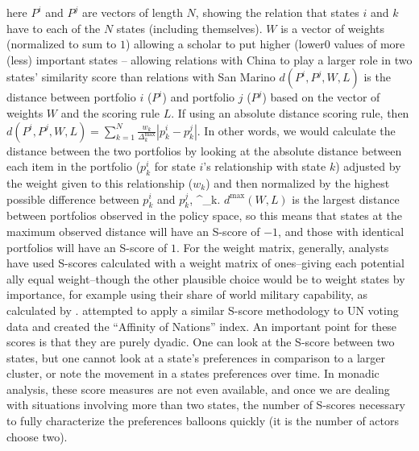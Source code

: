 \noindent here $P^{i}$ and $P^{j}$ are vectors of length $N$, showing the relation that states $i$ and $k$ have to each of the $N$ states (including themselves). $W$ is a vector of weights (normalized to sum to $1$) allowing a scholar to put higher (lower0 values of more (less) important states -- allowing relations with China to play a larger role in two states' similarity score than relations with San Marino $d(P^i, P^j, W, L)$ is the distance between portfolio $i$ ($P^i$) and portfolio $j$ ($P^j$) based on the vector of weights $W$ and the scoring rule $L$. If using an absolute distance scoring rule, then $d(P^i, P^j, W, L) = \sum_{k = 1}^N \frac{w_k}{\Delta^\text{max}_{k}} |p^i_k - p^j_k|$. In other words, we would calculate the distance between the two portfolios by looking at the absolute distance between each item in the portfolio ($p^i_{k}$ for state $i$'s relationship with state $k$) adjusted by the weight given to this relationship ($w_{k}$) and then normalized by the highest possible difference between $p^i_{k}$ and $p^j_{k}$,  \Delta^_{k}. $d^{\text{max}}(W,L)$ is the largest distance between portfolios observed in the policy space, so this means that states at the maximum observed distance will have an S-score of $-1$, and those with identical portfolios will have an S-score of $1$. For the weight matrix, generally, analysts have used S-scores calculated with a weight matrix of ones--giving each potential ally equal weight--though the other plausible choice would be to weight states by importance, for example using their share of world military capability, as calculated by \citet{singer:small:1995}. \citet{gartzke:1998} attempted to apply a similar S-score methodology to UN voting data and created the ``Affinity of Nations'' index. An important point for these scores is that they are purely dyadic. One can look at the S-score between two states, but one cannot look at a state's preferences in comparison to a larger cluster, or note the movement in a states preferences over time. In monadic analysis, these score measures are not even available, and once we are dealing with situations involving more than two states, the number of S-scores necessary to fully characterize the preferences balloons quickly (it is the number of actors choose two). 

